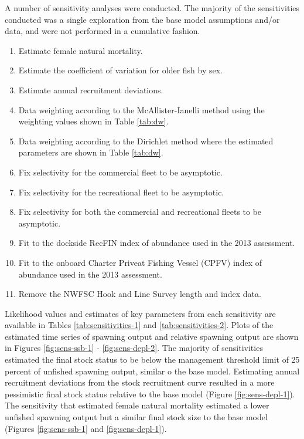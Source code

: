 \documentclass[11pt,
  english,
  a4paper,
]{article}
\begin{document}
A number of sensitivity analyses were conducted. The majority of the sensitivities conducted was a single exploration from the base model assumptions and/or data, and were not performed in a cumulative fashion.

\leavevmode\tagmcend\tagstructend\par

\begin{enumerate}
   
  \item Estimate female natural mortality.

  \item Estimate the coefficient of variation for older fish by sex. 

  \item Estimate annual recruitment deviations.

  \item Data weighting according to the McAllister-Ianelli method using the weighting values shown in Table \ref{tab:dw}. 
  
  \item Data weighting according to the Dirichlet method where the estimated parameters are shown in Table \ref{tab:dw}.

  \item Fix selectivity for the commercial fleet to be asymptotic. 
  
  \item Fix selectivity for the recreational fleet to be asymptotic. 
    
  \item Fix selectivity for both the commercial and recreational fleets to be asymptotic. 
  
  \item Fit to the dockside RecFIN index of abundance used in the 2013 assessment. 

  \item Fit to the onboard Charter Priveat Fishing Vessel (CPFV) index of abundance used in the 2013 assessment. 

  \item Remove the NWFSC Hook and Line Survey length and index data.
  
\end{enumerate}


Likelihood values and estimates of key parameters from each sensitivity are available in Tables \ref{tab:sensitivities-1} and \ref{tab:sensitivities-2}. Plots of the estimated time series of spawning output and relative spawning output are shown in Figures \ref{fig:sens-ssb-1} - \ref{fig:sens-depl-2}. The majority of sensitivities estimated the final stock status to be below the management threshold limit of 25 percent of unfished spawning output, similar o the base model. Estimating annual recruitment deviations from the stock recruitment curve resulted in a more pessimistic final stock status relative to the base model (Figure \ref{fig:sens-depl-1}). The sensitivity that estimated female natural mortality estimated a lower unfished spawning output but a similar final stock size to the base model (Figures \ref{fig:sens-ssb-1} and \ref{fig:sens-depl-1}).
\end{document}
